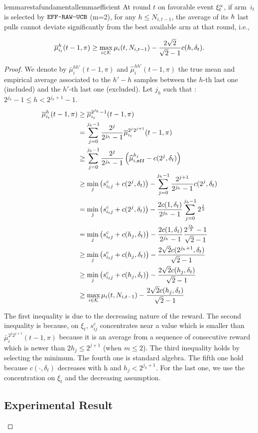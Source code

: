 \begin{restatable}{lemma}{restafundamentallemmaefficient}
\label{fundamental-lemma_efficient}
At round $t$ on favorable event $\xi^\alpha_t$, if arm~$i_{t}$ is selected by $\normalfont \texttt{EFF-RAW-UCB}$ (m=2), for any $h \leq N_{i,t-1}$,  the average of its $h$ last pulls cannot deviate significantly from the best available arm at that round, i.e.,

\vspace{-4pt}
\begin{equation*}
\overline{\mu}^{h}_{i_{t}}(t-1,\pi) \geq \max_{i \in \mathcal{K}}\mu_i(t,N_{i,t-1}) - \frac{2\sqrt{2}}{\sqrt{2}-1} c(h, \delta_{t}).
\end{equation*}
\end{restatable}
\begin{proof}
We denote by $\bar{\mu}^{hh'}_i(t-1,\pi)$ and $\hat{\mu}^{hh'}_i(t-1,\pi)$ the true mean and empirical average associated to the $h'-h$ samples between the $h$-th last one (included) and the $h'$-th last one (excluded). Let $j_h$ such that :
$2^{j_h} -1 \leq  h < 2^{j_h+1}-1$.
\begin{align*}
\overline{\mu}^{h}_{i_t}(t-1,\pi) &\geq \overline{\mu}^{2^{j_h}-1}_{i_t}(t-1,\pi)\\ & = \sum_{j=0}^{j_h-1} \frac{2^j}{2^{j_h}-1} \overline{\mu}^{2^{j}2^{j+1}}_{i_t}(t-1,\pi)\\ & \geq \sum_{j=0}^{j_h-1} \frac{2^j}{2^{j_h}-1} \left(\widehat{\mu}_{i,\texttt{eff}}^{h_j} - c(2^j, \delta_t)\right)\\
& \geq \min_j\left(s_{i_tj}^c + c(2^j, \delta_t)\right) - \sum_{j=0}^{j_h-1} \frac{2^{j+1}}{2^{j_h}-1}c(2^j, \delta_t)\\
& = \min_j\left(s_{i_tj}^c + c(2^j, \delta_t)\right) - \frac{2c(1, \delta_t)}{2^{j_h}-1}\sum_{j=0}^{j_h-1} 2^{\frac{j}{2}}\\
& = \min_j\left(s_{i_tj}^c + c(h_j, \delta_t)\right) - \frac{2c(1, \delta_t)}{2^{j_h}-1} \frac{2^{\frac{j_h}{2}}-1}{\sqrt{2}-1}\\
& \geq \min_j\left(s_{i_tj}^c + c(h_j, \delta_t)\right) - \frac{2\sqrt{2}c(2^{j_h+1}, \delta_t)}{\sqrt{2}-1}\\
& \geq \min_j\left(s_{i_tj}^c + c(h_j, \delta_t)\right) - \frac{2\sqrt{2}c(h_j, \delta_t)}{\sqrt{2}-1}\\
& \geq \max_{i\in\mathcal{K}}\mu_i(t,N_{i,t-1})  - \frac{2\sqrt{2}c(h_j, \delta_t)}{\sqrt{2}-1} 
\end{align*}

The first inequality is due to the decreasing nature of the reward. The second inequality is because, on $\xi_t$, $s_{ij}^c$ concentrates near a value which is smaller than $\bar{\mu}^{2^{j}2^{j+1}}_i(t-1,\pi)$  because it is an average from a sequence of consecutive reward which is newer than $2h_j \leq 2^{j+1}$ (when $m \leq 2$). The third inequality holds by selecting the minimum. The fourth one is standard algebra. The fifth one hold because $c( \cdot, \delta_t)$ decreases with h and $h_j < 2^{j_h+1}$. For the last one, we use the concentration on $\xi_t$ and the decreasing assumption. 

\subsection{Experimental Result}




\end{proof}
